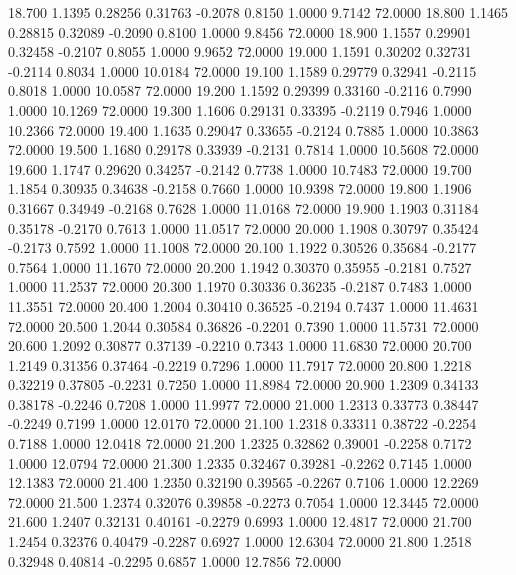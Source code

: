   18.700   1.1395   0.28256   0.31763  -0.2078   0.8150   1.0000   9.7142  72.0000
  18.800   1.1465   0.28815   0.32089  -0.2090   0.8100   1.0000   9.8456  72.0000
  18.900   1.1557   0.29901   0.32458  -0.2107   0.8055   1.0000   9.9652  72.0000
  19.000   1.1591   0.30202   0.32731  -0.2114   0.8034   1.0000  10.0184  72.0000
  19.100   1.1589   0.29779   0.32941  -0.2115   0.8018   1.0000  10.0587  72.0000
  19.200   1.1592   0.29399   0.33160  -0.2116   0.7990   1.0000  10.1269  72.0000
  19.300   1.1606   0.29131   0.33395  -0.2119   0.7946   1.0000  10.2366  72.0000
  19.400   1.1635   0.29047   0.33655  -0.2124   0.7885   1.0000  10.3863  72.0000
  19.500   1.1680   0.29178   0.33939  -0.2131   0.7814   1.0000  10.5608  72.0000
  19.600   1.1747   0.29620   0.34257  -0.2142   0.7738   1.0000  10.7483  72.0000
  19.700   1.1854   0.30935   0.34638  -0.2158   0.7660   1.0000  10.9398  72.0000
  19.800   1.1906   0.31667   0.34949  -0.2168   0.7628   1.0000  11.0168  72.0000
  19.900   1.1903   0.31184   0.35178  -0.2170   0.7613   1.0000  11.0517  72.0000
  20.000   1.1908   0.30797   0.35424  -0.2173   0.7592   1.0000  11.1008  72.0000
  20.100   1.1922   0.30526   0.35684  -0.2177   0.7564   1.0000  11.1670  72.0000
  20.200   1.1942   0.30370   0.35955  -0.2181   0.7527   1.0000  11.2537  72.0000
  20.300   1.1970   0.30336   0.36235  -0.2187   0.7483   1.0000  11.3551  72.0000
  20.400   1.2004   0.30410   0.36525  -0.2194   0.7437   1.0000  11.4631  72.0000
  20.500   1.2044   0.30584   0.36826  -0.2201   0.7390   1.0000  11.5731  72.0000
  20.600   1.2092   0.30877   0.37139  -0.2210   0.7343   1.0000  11.6830  72.0000
  20.700   1.2149   0.31356   0.37464  -0.2219   0.7296   1.0000  11.7917  72.0000
  20.800   1.2218   0.32219   0.37805  -0.2231   0.7250   1.0000  11.8984  72.0000
  20.900   1.2309   0.34133   0.38178  -0.2246   0.7208   1.0000  11.9977  72.0000
  21.000   1.2313   0.33773   0.38447  -0.2249   0.7199   1.0000  12.0170  72.0000
  21.100   1.2318   0.33311   0.38722  -0.2254   0.7188   1.0000  12.0418  72.0000
  21.200   1.2325   0.32862   0.39001  -0.2258   0.7172   1.0000  12.0794  72.0000
  21.300   1.2335   0.32467   0.39281  -0.2262   0.7145   1.0000  12.1383  72.0000
  21.400   1.2350   0.32190   0.39565  -0.2267   0.7106   1.0000  12.2269  72.0000
  21.500   1.2374   0.32076   0.39858  -0.2273   0.7054   1.0000  12.3445  72.0000
  21.600   1.2407   0.32131   0.40161  -0.2279   0.6993   1.0000  12.4817  72.0000
  21.700   1.2454   0.32376   0.40479  -0.2287   0.6927   1.0000  12.6304  72.0000
  21.800   1.2518   0.32948   0.40814  -0.2295   0.6857   1.0000  12.7856  72.0000
